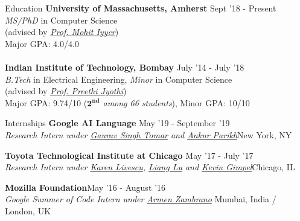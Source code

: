 \documentclass{resume} %
\begin{document}
\begin{rSection}{Education}
\vspace*{0.1in}
{\bf University of Massachusetts, Amherst} \hfill {Sept '18 - Present} \\ \textit{MS/PhD} in Computer Science \\ (advised by \textit{\href{https://people.cs.umass.edu/~miyyer/}{Prof. Mohit Iyyer}}) \\
Major GPA: 4.0/4.0\\\\
{\bf Indian Institute of Technology, Bombay} \hfill {July '14 - July '18} \\ 
\textit{B.Tech} in Electrical Engineering, \textit{Minor} in Computer Science\\
(advised by \textit{\href{https://www.cse.iitb.ac.in/~pjyothi/}{Prof. Preethi Jyothi}})\\
Major GPA: 9.74/10 (\textit{$\mathbf{2^{nd}}$ among 66 students}), Minor GPA: 10/10
\end{rSection}

\begin{rSection}{Internships}
\vspace*{0.1in}
{\bf Google AI Language}{ \hfill May '19 - September '19}\\ \textit{Research Intern under \href{https://ai.google/research/people/GauravSinghTomar/}{Gaurav Singh Tomar} and \href{www.ankurparikh.com}{Ankur Parikh}}{\hfill New York, NY}

{\bf Toyota Technological Institute at Chicago}{ \hfill May '17 - July '17}\\ \textit{Research Intern under \href{http://ttic.uchicago.edu/~klivescu/}{Karen Livescu}, \href{http://ttic.uchicago.edu/~llu/}{Liang Lu} and \href{http://ttic.uchicago.edu/~kgimpel/}{Kevin Gimpel}}{\hfill Chicago, IL}

{\bf Mozilla Foundation}{\hfill May '16 - August '16} \\ \textit{Google Summer of Code Intern under \href{https://github.com/armenzg}{Armen Zambrano}}{ \hfill Mumbai, India / London, UK}
\end{rSection}
\end{document}
